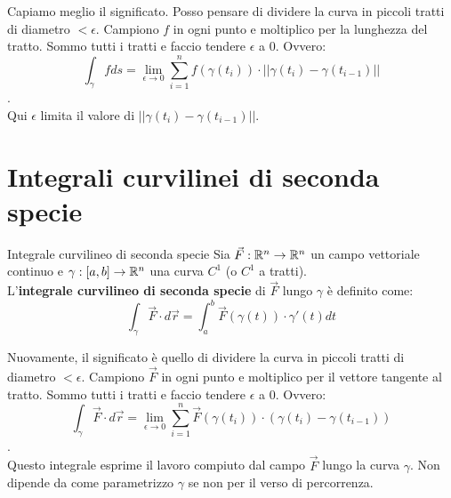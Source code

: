 Capiamo meglio il significato. Posso pensare di dividere la curva in piccoli tratti di diametro $< \epsilon$. Campiono $f$ in ogni punto e moltiplico per la lunghezza del tratto. Sommo tutti i tratti e faccio tendere $\epsilon$ a 0. Ovvero:
$$\int_\gamma f ds = \lim_{\epsilon \rightarrow 0} \sum_{i=1}^n f(\gamma(t_i)) \cdot ||\gamma(t_i) - \gamma(t_{i-1})||$$.\\
Qui $\epsilon$ limita il valore di $||\gamma(t_i) - \gamma(t_{i-1})||$.\\

\section{Integrali curvilinei di seconda specie}\label{sec:integrali-curvilinei-di-seconda-specie}
\begin{definizione}{Integrale curvilineo di seconda specie}
  Sia $\vec F: \mathbb{R}^n \rightarrow \mathbb{R}^n$ un campo vettoriale continuo e $\gamma: [a, b] \rightarrow \mathbb{R}^n$ una curva $C^1$ (o $C^1$ a tratti).\\
  L'\textbf{integrale curvilineo di seconda specie} di $\vec F$ lungo $\gamma$ è definito come:
  $$\int_\gamma \vec F \cdot d\vec r = \int_a^b \vec F(\gamma(t)) \cdot \gamma'(t) dt$$
\end{definizione}

Nuovamente, il significato è quello di dividere la curva in piccoli tratti di diametro $< \epsilon$. Campiono $\vec F$ in ogni punto e moltiplico per il vettore tangente al tratto. Sommo tutti i tratti e faccio tendere $\epsilon$ a 0. Ovvero:
$$\int_\gamma \vec F \cdot d\vec r = \lim_{\epsilon \rightarrow 0} \sum_{i=1}^n \vec F(\gamma(t_i)) \cdot (\gamma(t_i) - \gamma(t_{i-1}))$$.\\
Questo integrale esprime il lavoro compiuto dal campo $\vec F$ lungo la curva $\gamma$. Non dipende da come parametrizzo $\gamma$ se non per il verso di percorrenza.

